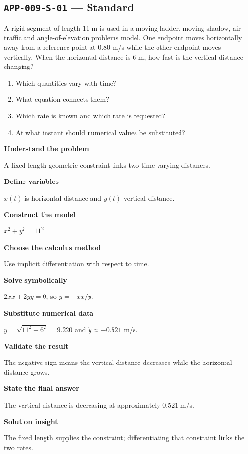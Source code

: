 \documentclass[11pt]{book}
\newcommand{\pid}[1]{\texttt{#1}}
\begin{document}
\subsection*{\pid{APP-009-S-01} — Standard}
\begin{problembox}
A rigid segment of length 11 m is used in a moving ladder, moving shadow, air-traffic and angle-of-elevation problems model. One endpoint moves horizontally away from a reference point at 0.80 m/s while the other endpoint moves vertically. When the horizontal distance is 6 m, how fast is the vertical distance changing?
\end{problembox}
\begin{promptbox}\begin{enumerate}
\item Which quantities vary with time?
\item What equation connects them?
\item Which rate is known and which rate is requested?
\item At what instant should numerical values be substituted?
\end{enumerate}\end{promptbox}
\begin{solutionbox}
\textbf{Understand the problem}\par A fixed-length geometric constraint links two time-varying distances.\par\medskip
\textbf{Define variables}\par $x(t)$ is horizontal distance and $y(t)$ vertical distance.\par\medskip
\textbf{Construct the model}\par $x^2+y^2=11^2$.\par\medskip
\textbf{Choose the calculus method}\par Use implicit differentiation with respect to time.\par\medskip
\textbf{Solve symbolically}\par $2x\dot x+2y\dot y=0$, so $\dot y=-x\dot x/y$.\par\medskip
\textbf{Substitute numerical data}\par $y=\sqrt{11^2-6^2}=9.220$ and $\dot y\approx -0.521$ m/s.\par\medskip
\textbf{Validate the result}\par The negative sign means the vertical distance decreases while the horizontal distance grows.\par\medskip
\textbf{State the final answer}\par The vertical distance is decreasing at approximately $0.521$ m/s.\par\medskip
\textbf{Solution insight}\par The fixed length supplies the constraint; differentiating that constraint links the two rates.\par\medskip
\end{solutionbox}
\end{document}
